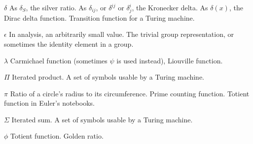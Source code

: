\documentclass[12pt]{article}
\begin{document}







$\delta$ As $\delta_S$, the silver ratio. As $\delta_{ij}$, or $\delta^{ij}$ or $\delta^i_j$, the Kronecker delta. As $\delta(x)$, the Dirac delta function. Transition function for a Turing machine.


$\epsilon$ In analysis, an arbitrarily small value. The trivial group representation, or sometimes the identity element in a group.












$\lambda$ Carmichael function (sometimes $\psi$ is used instead), Liouville function.









$\Pi$ Iterated product. A set of symbols usable by a Turing machine.

$\pi$ Ratio of a circle's radius to its circumference. Prime counting function. Totient function in Euler's notebooks.



$\Sigma$ Iterated sum. A set of symbols usable by a Turing machine.






$\phi$ Totient function. Golden ratio.







\end{document}
